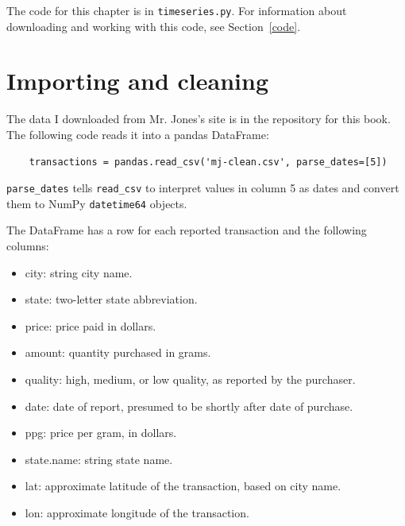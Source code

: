 \documentclass[12pt]{book}
\begin{document}
The code for this chapter is in \verb"timeseries.py".  For information
about downloading and working with this code, see Section~\ref{code}.


\section{Importing and cleaning}

The data I downloaded from
Mr. Jones's site is in the repository for this book.
The following code reads it into a
pandas DataFrame:

\begin{verbatim}
    transactions = pandas.read_csv('mj-clean.csv', parse_dates=[5])
\end{verbatim}

\verb"parse_dates" tells \verb"read_csv" to interpret values in column 5
as dates and convert them to NumPy \verb"datetime64" objects.

The DataFrame has a row for each reported transaction and 
the following columns:

\begin{itemize}

\item city: string city name.

\item state: two-letter state abbreviation.

\item price: price paid in dollars.

\item amount: quantity purchased in grams.

\item quality: high, medium, or low quality, as reported by the purchaser.

\item date: date of report, presumed to be shortly after date of purchase.

\item ppg: price per gram, in dollars.

\item state.name: string state name.

\item lat: approximate latitude of the transaction, based on city name.

\item lon: approximate longitude of the transaction.

\end{itemize}
\end{document}
